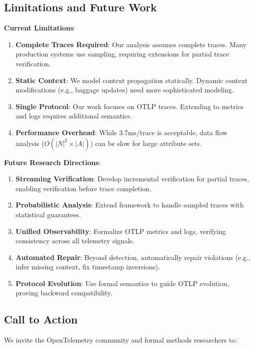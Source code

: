 \subsection{Limitations and Future Work}
\label{sec:limitations}

\textbf{Current Limitations}:

\begin{enumerate}
\item \textbf{Complete Traces Required}: Our analysis assumes complete traces. Many production systems use sampling, requiring extensions for partial trace verification.
\item \textbf{Static Context}: We model context propagation statically. Dynamic context modifications (e.g., baggage updates) need more sophisticated modeling.
\item \textbf{Single Protocol}: Our work focuses on OTLP traces. Extending to metrics and logs requires additional semantics.
\item \textbf{Performance Overhead}: While 3.7ms/trace is acceptable, data flow analysis ($O(|N|^2 \times |A|)$) can be slow for large attribute sets.
\end{enumerate}

\textbf{Future Research Directions}:

\begin{enumerate}
\item \textbf{Streaming Verification}: Develop incremental verification for partial traces, enabling verification before trace completion.
\item \textbf{Probabilistic Analysis}: Extend framework to handle sampled traces with statistical guarantees.
\item \textbf{Unified Observability}: Formalize OTLP metrics and logs, verifying consistency across all telemetry signals.
\item \textbf{Automated Repair}: Beyond detection, automatically repair violations (e.g., infer missing context, fix timestamp inversions).
\item \textbf{Protocol Evolution}: Use formal semantics to guide OTLP evolution, proving backward compatibility.
\end{enumerate}

\subsection{Call to Action}
\label{sec:call-to-action}

We invite the OpenTelemetry community and formal methods researchers to:

